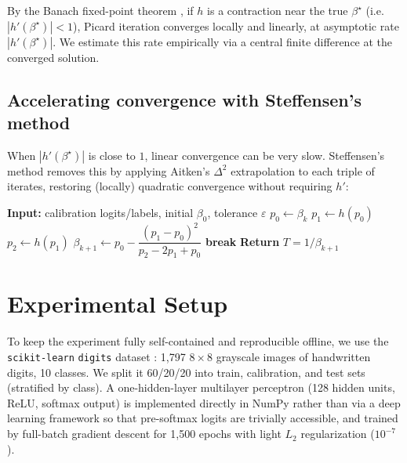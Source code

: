 \documentclass[11pt]{article}
\begin{document}
By the Banach fixed-point theorem \citep{banach1922operations}, if $h$
is a contraction near the true $\beta^\star$ (i.e.\ $|h'(\beta^\star)| < 1$),
Picard iteration converges locally and linearly, at asymptotic rate
$|h'(\beta^\star)|$. We estimate this rate empirically via a central
finite difference at the converged solution.

\subsection{Accelerating convergence with Steffensen's method}

When $|h'(\beta^\star)|$ is close to $1$, linear convergence can be
very slow. Steffensen's method \citep{steffensen1933remarks} removes
this by applying Aitken's $\Delta^2$ extrapolation
\citep{aitken1926bernoulli} to each triple of iterates, restoring
(locally) quadratic convergence without requiring $h'$:

\begin{algorithm}[h]
\caption{Steffensen-accelerated fixed-point temperature calibration}
\begin{algorithmic}[1]
\State \textbf{Input:} calibration logits/labels, initial $\beta_0$, tolerance $\varepsilon$
  \State $p_0 \gets \beta_k$
  \State $p_1 \gets h(p_0)$
  \State $p_2 \gets h(p_1)$
  \State $\beta_{k+1} \gets p_0 - \dfrac{(p_1 - p_0)^2}{p_2 - 2p_1 + p_0}$
   \textbf{break} \EndIf
\EndFor
\State \textbf{Return} $T = 1/\beta_{k+1}$
\end{algorithmic}
\end{algorithm}

\section{Experimental Setup}

To keep the experiment fully self-contained and reproducible offline,
we use the \texttt{scikit-learn} \texttt{digits} dataset
\citep{sklearn_digits}: 1{,}797 $8\times8$ grayscale images of
handwritten digits, 10 classes. We split it 60/20/20 into train,
calibration, and test sets (stratified by class). A one-hidden-layer
multilayer perceptron (128 hidden units, ReLU, softmax output) is
implemented directly in NumPy rather than via a deep learning
framework so that pre-softmax logits are trivially accessible, and
trained by full-batch gradient descent for 1{,}500 epochs with light
$L_2$ regularization ($10^{-7}$).
\end{document}
